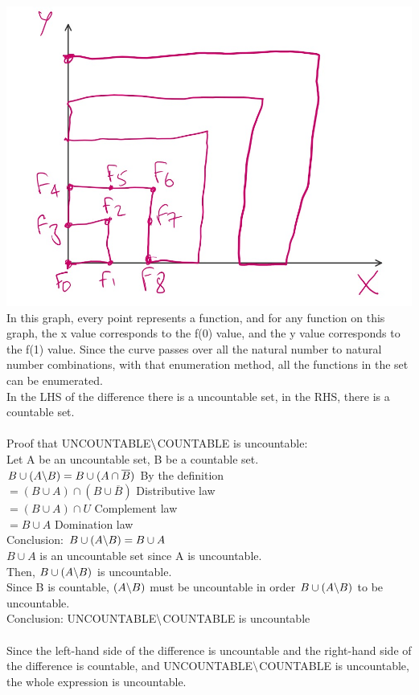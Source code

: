 \documentclass[10pt]{article}
\begin{document}
\includegraphics[scale=0.2]{proof.jpeg}\\
In this graph, every point represents a function, and for any function on this graph, the x value corresponds to the f(0) value, and the y value corresponds to the f(1) value. Since the curve passes over all the natural number to natural number combinations, with that enumeration method, all the functions in the set can be enumerated.\\
In the LHS of the difference there is a uncountable set, in the RHS, there is a countable set.\\\\
Proof that UNCOUNTABLE$\symbol{92}$COUNTABLE is uncountable:\\
Let A be an uncountable set, B be a countable set.\\
$B\cup(A\symbol{92}B) = B\cup(A\cap\overline{B})$ By the definition\\
$=(B\cup A)\cap(B\cup \overline{B})$ Distributive law\\
$=(B\cup A)\cap U$ Complement law\\
$=B\cup A$ Domination law\\
Conclusion: $B\cup(A\symbol{92}B)=B\cup A$\\
$B\cup A$ is an uncountable set since A is uncountable.\\
Then,  $B\cup(A\symbol{92}B)$ is uncountable.\\
Since B is countable, $(A\symbol{92}B)$ must be uncountable in order $B\cup(A\symbol{92}B)$ to be uncountable.\\
Conclusion: UNCOUNTABLE$\symbol{92}$COUNTABLE is uncountable\\\\
Since the left-hand side of the difference is uncountable and the right-hand side of the difference is countable, and UNCOUNTABLE$\symbol{92}$COUNTABLE is uncountable, the whole expression is uncountable.
\end{document}
